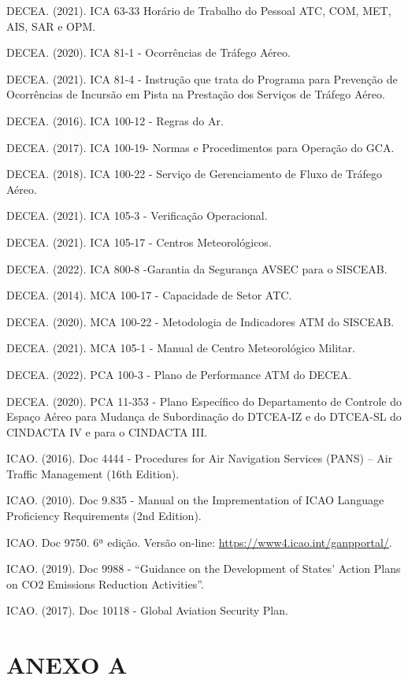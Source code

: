 \documentclass[
]{book}
\begin{document}
DECEA. (2021). ICA 63-33 Horário de Trabalho do Pessoal ATC, COM, MET, AIS, SAR e OPM.

DECEA. (2020). ICA 81-1 - Ocorrências de Tráfego Aéreo.

DECEA. (2021). ICA 81-4 - Instrução que trata do Programa para Prevenção de Ocorrências de Incursão em Pista na Prestação dos Serviços de Tráfego Aéreo.

DECEA. (2016). ICA 100-12 - Regras do Ar.

DECEA. (2017). ICA 100-19- Normas e Procedimentos para Operação do GCA.

DECEA. (2018). ICA 100-22 - Serviço de Gerenciamento de Fluxo de Tráfego Aéreo.

DECEA. (2021). ICA 105-3 - Verificação Operacional.

DECEA. (2021). ICA 105-17 - Centros Meteorológicos.

DECEA. (2022). ICA 800-8 -Garantia da Segurança AVSEC para o SISCEAB.

DECEA. (2014). MCA 100-17 - Capacidade de Setor ATC.

DECEA. (2020). MCA 100-22 - Metodologia de Indicadores ATM do SISCEAB.

DECEA. (2021). MCA 105-1 - Manual de Centro Meteorológico Militar.

DECEA. (2022). PCA 100-3 - Plano de Performance ATM do DECEA.

DECEA. (2020). PCA 11-353 - Plano Específico do Departamento de Controle do Espaço Aéreo para Mudança de Subordinação do DTCEA-IZ e do DTCEA-SL do CINDACTA IV e para o CINDACTA III.

ICAO. (2016). Doc 4444 - Procedures for Air Navigation Services (PANS) -- Air Traffic Management (16th Edition).

ICAO. (2010). Doc 9.835 - Manual on the Imprementation of ICAO Language Proficiency Requirements (2nd Edition).

ICAO. Doc 9750. 6ª edição. Versão on-line: \url{https://www4.icao.int/ganpportal/}.

ICAO. (2019). Doc 9988 - ``Guidance on the Development of States' Action Plans on CO2 Emissions Reduction Activities''.

ICAO. (2017). Doc 10118 - Global Aviation Security Plan.

\hypertarget{anexo-a}{%
\chapter{ANEXO A}\label{anexo-a}}
\end{document}
